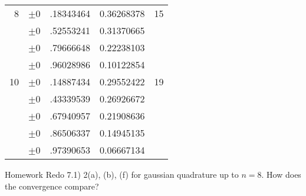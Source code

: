 \begin{table}
\begin{tabular}{rr@{}llc}
8  & $\pm$0&.18343464                             & 0.36268378     & 15 \\
   & $\pm$0&.52553241                             & 0.31370665     & \\
   & $\pm$0&.79666648                             & 0.22238103     & \\
   & $\pm$0&.96028986                             & 0.10122854     & \\ \hline
10 & $\pm$0&.14887434                             & 0.29552422     & 19 \\
   & $\pm$0&.43339539                             & 0.26926672     & \\
   & $\pm$0&.67940957                             & 0.21908636     & \\
   & $\pm$0&.86506337                             & 0.14945135     & \\
   & $\pm$0&.97390653                             & 0.06667134     & \\ \hline
\end{tabular}
\end{table}



Homework Redo 7.1) 2(a), (b), (f) for gaussian quadrature up to
$n=8$.  How does the convergence compare?

